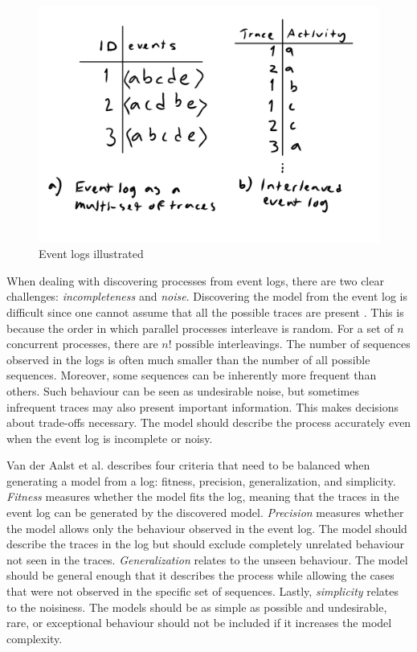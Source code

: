 \begin{figure}[htb]
\centering \includegraphics[width=0.7\linewidth]{gfx/figures/traceeventlog.png}
\caption{Event logs illustrated  }
\label{fig:tracevslog}
\end{figure}

When dealing with discovering processes from event logs, there are two clear challenges: \emph{incompleteness} and \emph{noise}. 
Discovering the model from the event log is difficult since one cannot assume that all the possible traces are present \cite{van2013discovering}. 
This is because the order in which parallel processes interleave is random. 
For a set of $n$ concurrent processes, there are $n!$ possible interleavings. 
The number of sequences observed in the logs \cite{van2007business} is often much smaller than the number of all possible sequences.
Moreover, some sequences can be inherently more frequent than others. 
Such behaviour can be seen as undesirable noise, but sometimes infrequent traces may also present important information.
This makes decisions about trade-offs necessary. 
The model should describe the process accurately even when the event log is incomplete or noisy.

Van der Aalst et al. \cite{van2013discovering} describes four criteria that need to be balanced when generating a model from a log: fitness, precision, generalization, and simplicity.
\emph{Fitness} measures whether the model fits the log, meaning that the traces in the event log can be generated by the discovered model.
\emph{Precision} measures whether the model allows only the behaviour observed in the event log. The model should describe the traces in the log but should exclude completely unrelated behaviour not seen in the traces.
\emph{Generalization} relates to the unseen behaviour. The model should be general enough that it describes the process while allowing the cases that were not observed in the specific set of sequences.
Lastly, \emph{simplicity} relates to the noisiness. The models should be as simple as possible and undesirable, rare, or exceptional behaviour should not be included if it increases the model complexity.


